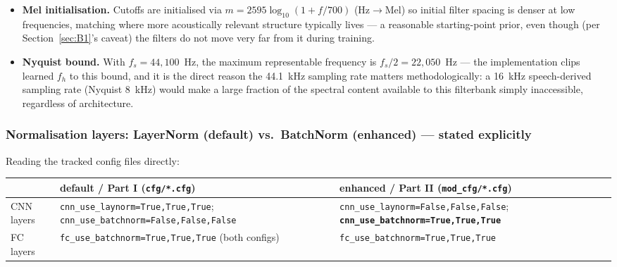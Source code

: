 \documentclass[11pt]{article}
\begin{document}
\begin{itemize}
\item \textbf{Mel initialisation.} Cutoffs are initialised via
  $m = 2595\log_{10}(1+f/700)$ (Hz$\to$Mel) so initial filter spacing is
  denser at low frequencies, matching where more acoustically relevant
  structure typically lives --- a reasonable starting-point prior, even
  though (per Section~\ref{sec:B1}'s caveat) the filters do not move very
  far from it during training.
\item \textbf{Nyquist bound.} With $f_s=44{,}100$~Hz, the maximum
  representable frequency is $f_s/2=22{,}050$~Hz --- the implementation
  clips learned $f_h$ to this bound, and it is the direct reason the
  44.1~kHz sampling rate matters methodologically: a 16~kHz speech-derived
  sampling rate (Nyquist 8~kHz) would make a large fraction of the spectral
  content available to this filterbank simply inaccessible, regardless of
  architecture.
\end{itemize}

\subsubsection{Normalisation layers: LayerNorm (default) vs.\ BatchNorm (enhanced) --- stated explicitly}
\label{sec:B34}

Reading the tracked config files directly:

\begin{table}[h]
\centering
\begin{tabularx}{\textwidth}{l Y Y}
\toprule
 & default / Part I (\texttt{cfg/*.cfg}) & enhanced / Part II (\texttt{mod\_cfg/*.cfg}) \\
\midrule
CNN layers & \texttt{cnn\_use\_laynorm=True,True,True}; \texttt{cnn\_use\_batchnorm=False,False,False} & \texttt{cnn\_use\_laynorm=False,False,False}; \textbf{\texttt{cnn\_use\_batchnorm=True,True,True}} \\
FC layers  & \texttt{fc\_use\_batchnorm=True,True,True} (both configs) & \texttt{fc\_use\_batchnorm=True,True,True} \\
\bottomrule
\end{tabularx}
\end{table}
\end{document}
